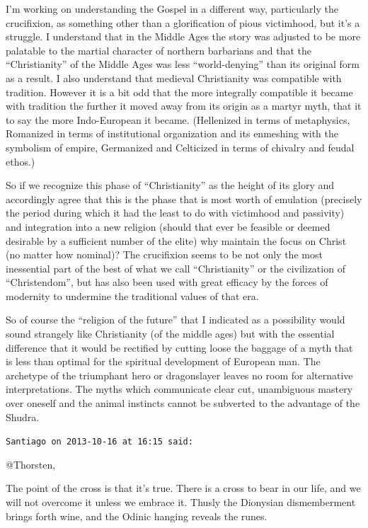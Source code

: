 \begin{footnotesize}
\begin{sffamily}
I'm working on understanding the Gospel in a different way, particularly the crucifixion, as something other than a glorification of pious victimhood, but it's a struggle. I understand that in the Middle Ages the story was adjusted to be more palatable to the martial character of northern barbarians and that the ``Christianity'' of the Middle Ages was less ``world-denying'' than its original form as a result. I also understand that medieval Christianity was compatible with tradition. However it is a bit odd that the more integrally compatible it became with tradition the further it moved away from its origin as a martyr myth, that it to say the more Indo-European it became. (Hellenized in terms of metaphysics, Romanized in terms of institutional organization and its enmeshing with the symbolism of empire, Germanized and Celticized in terms of chivalry and feudal ethos.)

So if we recognize this phase of ``Christianity'' as the height of its glory and accordingly agree that this is the phase that is most worth of emulation (precisely the period during which it had the least to do with victimhood and passivity) and integration into a new religion (should that ever be feasible or deemed desirable by a sufficient number of the elite) why maintain the focus on Christ (no matter how nominal)? The crucifixion seems to be not only the most inessential part of the best of what we call ``Christianity'' or the civilization of ``Christendom'', but has also been used with great efficacy by the forces of modernity to undermine the traditional values of that era.

So of course the ``religion of the future'' that I indicated as a possibility would sound strangely like Christianity (of the middle ages) but with the essential difference that it would be rectified by cutting loose the baggage of a myth that is less than optimal for the spiritual development of European man. The archetype of the triumphant hero or dragonslayer leaves no room for alternative interpretations. The myths which communicate clear cut, unambiguous mastery over oneself and the animal instincts cannot be subverted to the advantage of the Shudra.

\hfill

\texttt{Santiago on 2013-10-16 at 16:15 said:}

@Thorsten,

The point of the cross is that it's true. There is a cross to bear in our life, and we will not overcome it unless we embrace it. Thusly the Dionysian dismemberment brings forth wine, and the Odinic hanging reveals the runes.


\end{sffamily}
\end{footnotesize}
